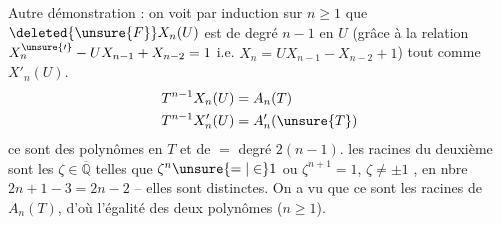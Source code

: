 Autre démonstration : on voit par induction sur $n\geq1$
que $\deleted{\unsure{F}}X_n(U)$ est  de degré $n-1$ en $U$ (grâce à la relation
$X^{\unsure{\prime}}_n-UX_{n-1}+X_{n-2}=1$ i.e. $X_n=UX_{n-1}-X_{n-2}+1$) 
tout comme $X'_n(U)$. 
\[
\begin{aligned}T^{n-1}X_n(U)&=A_n(T)\\T^{n-1}X'_n(U)&=A'_n(\unsure{T})\end{aligned}
\]
ce sont des polynômes  en $T$ et de $=$
degré $2(n-1)$. les racines du deuxième  sont
les  $\zeta\in\overline{\mathbb Q}$ telles que $\zeta^n\unsure{=|\in}1$ ou $\zeta^{n+1}=1$,
$\zeta\ne\pm1$ , en nbre $2n+1-3=2n-2$ -- elles sont
distinctes. On a vu que ce sont les racines
de $A_n(T)$, d'où l'égalité des deux polynômes
($n\geq1$).

